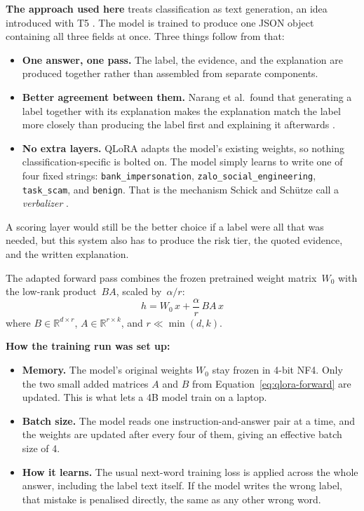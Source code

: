 \textbf{The approach used here} treats classification as text generation, an idea introduced with T5 \cite{raffel2020t5}. The model is trained to produce one JSON object containing all three fields at once. Three things follow from that:

\begin{itemize}\itemsep2pt
\item \textbf{One answer, one pass.} The label, the evidence, and the explanation are produced together rather than assembled from separate components.
\item \textbf{Better agreement between them.} Narang et al.\ found that generating a label together with its explanation makes the explanation match the label more closely than producing the label first and explaining it afterwards \cite{narang2020wt5}.
\item \textbf{No extra layers.} QLoRA adapts the model's existing weights, so nothing classification-specific is bolted on. The model simply learns to write one of four fixed strings: \texttt{bank\_impersonation}, \texttt{zalo\_\allowbreak social\_\allowbreak engineering}, \texttt{task\_scam}, and \texttt{benign}. That is the mechanism Schick and Sch{\"u}tze call a \textit{verbalizer} \cite{schick2021pet}.
\end{itemize}

\noindent A scoring layer would still be the better choice if a label were all that was needed, but this system also has to produce the risk tier, the quoted evidence, and the written explanation.

The adapted forward pass combines the frozen pretrained weight matrix~$W_0$ with the low-rank product~$BA$, scaled by~$\alpha/r$:
\begin{equation}
  h = W_0\, x + \frac{\alpha}{r}\, B A\, x
  \label{eq:qlora-forward}
\end{equation}
where $B \in \mathbb{R}^{d \times r}$, $A \in \mathbb{R}^{r \times k}$, and $r \ll \min(d, k)$.

\noindent\textbf{How the training run was set up:}

\begin{itemize}\itemsep2pt
\item \textbf{Memory.} The model's original weights $W_0$ stay frozen in 4-bit NF4. Only the two small added matrices $A$ and $B$ from Equation~\ref{eq:qlora-forward} are updated. This is what lets a 4B model train on a laptop.
\item \textbf{Batch size.} The model reads one instruction-and-answer pair at a time, and the weights are updated after every four of them, giving an effective batch size of 4.
\item \textbf{How it learns.} The usual next-word training loss is applied across the whole answer, including the label text itself. If the model writes the wrong label, that mistake is penalised directly, the same as any other wrong word.
\end{itemize}

